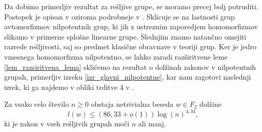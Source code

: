 Da dobimo primerljiv rezultat za rešljive grupe, se moramo precej bolj potruditi. Postopek je opisan v \cite[str.~3--4]{Thom_2015} oziroma podrobneje v \cite[str.~19--25]{Schneider_2016}. Sklicuje se na lastnosti grup avtomorfizmov nilpotentnih grup, ki jih z ustreznim zaporedjem homomorfizmov slikamo v primerne splošne linearne grupe. Slednjim znamo natančno omejiti razrede rešljivosti, saj so predmet klasične obravnave v teoriji grup. Ker je jedro vmesnega homomorfizma nilpotentno, se lahko zaradi razširitvene leme \ref{lem_razsiritvena_lema} skličemo na rezultat o dolžinah zakonov v nilpotentnih grupah, primerljiv izreku \ref{izr_glavni_nilpotentne}, kar nam zagotovi naslednji izrek, ki ga najdemo v obliki trditve 4 v \cite[str.~25]{Schneider_2016}.  

\begin{izrek}
\label{izr_glavni_izrek_resljive}
 Za vsako celo število $n \ge 0$ obstaja netrivialna beseda $w \in F_2$ dolžine \begin{equation*}
 l(w) \le (86{,}33 + o(1)) \log(n)^{4{,}34},
 \end{equation*}  
   ki je zakon v vseh rešljivih grupah moči $n$ ali manj. 
\end{izrek}